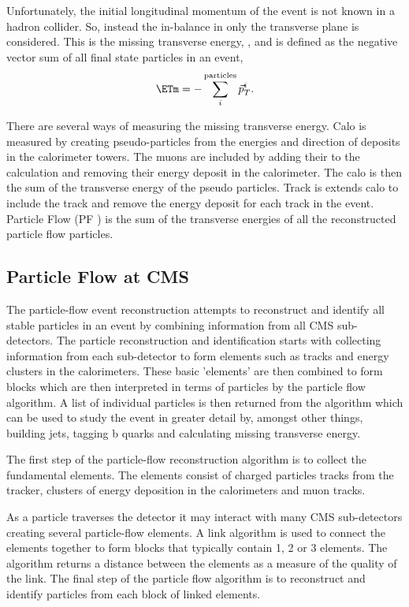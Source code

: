 Unfortunately, the initial longitudinal momentum of the event is not known in a
hadron collider. So, instead the in-balance in only the transverse plane is
considered. This is the missing transverse energy, \ETm, and is defined as
the negative vector sum of all final state particles in an event,
\begin{equation}
\ETm = -\sum_i^{\text{particles}} \vec{p}_{T}^{i}.
\end{equation}

There are several ways of measuring the missing transverse energy.
Calo \ETm is measured by creating pseudo-particles from the energies and
direction of deposits in the calorimeter towers. The muons are included by
adding their \Pt to the calculation and removing their energy deposit in the
calorimeter. The calo \ETm is then the sum of the transverse energy of the
pseudo particles.
Track \ETm is extends calo \ETm to include the track \Pt and remove the energy
deposit for each track in the event.
Particle Flow \ETm (PF \ETm) is the sum of the transverse energies of all the
reconstructed particle flow particles.\cite{PF}

\subsection{Particle Flow at CMS}

The particle-flow event reconstruction attempts to reconstruct and identify all
stable particles in an event by combining information from all CMS
sub-detectors. The particle reconstruction and identification starts with
collecting information from each sub-detector to form elements such as tracks
and energy clusters in the calorimeters. These basic 'elements' are then
combined to form blocks which are then interpreted in terms of particles by the
particle flow algorithm. A list of individual particles is then returned from
the algorithm which can be used to study the event in greater detail by,
amongst other things, building jets, tagging b quarks and calculating missing
transverse energy.\cite{PF}

The first step of the particle-flow reconstruction algorithm is to collect the
fundamental elements. The elements consist of charged particles tracks from the
tracker, clusters of energy deposition in the calorimeters and muon tracks.

As a particle traverses the detector it may interact with many CMS sub-detectors
creating several particle-flow elements. A link algorithm is used to connect
the elements together to form blocks that typically contain 1, 2 or 3 elements.
The algorithm returns a distance between the elements as a measure of the
quality of the link. The final step of the particle flow algorithm is to
reconstruct and identify particles from each block of linked elements.\cite{PF}

